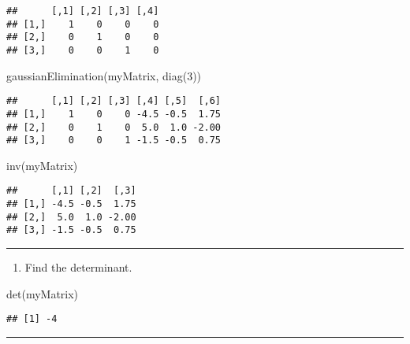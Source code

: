 \documentclass[
]{article}
\newenvironment{Shaded}{\begin{snugshade}}{\end{snugshade}}
\newcommand{\DecValTok}[1]{\textcolor[rgb]{0.00,0.00,0.81}{#1}}
\newcommand{\FunctionTok}[1]{\textcolor[rgb]{0.00,0.00,0.00}{#1}}
\newcommand{\NormalTok}[1]{#1}
\providecommand{\tightlist}{%
  \setlength{\itemsep}{0pt}\setlength{\parskip}{0pt}}
\begin{document}
\begin{verbatim}
##      [,1] [,2] [,3] [,4]
## [1,]    1    0    0    0
## [2,]    0    1    0    0
## [3,]    0    0    1    0
\end{verbatim}

\begin{Shaded}
\begin{Highlighting}[]
\FunctionTok{gaussianElimination}\NormalTok{(myMatrix, }\FunctionTok{diag}\NormalTok{(}\DecValTok{3}\NormalTok{))}
\end{Highlighting}
\end{Shaded}

\begin{verbatim}
##      [,1] [,2] [,3] [,4] [,5]  [,6]
## [1,]    1    0    0 -4.5 -0.5  1.75
## [2,]    0    1    0  5.0  1.0 -2.00
## [3,]    0    0    1 -1.5 -0.5  0.75
\end{verbatim}

\begin{Shaded}
\begin{Highlighting}[]
\FunctionTok{inv}\NormalTok{(myMatrix)}
\end{Highlighting}
\end{Shaded}

\begin{verbatim}
##      [,1] [,2]  [,3]
## [1,] -4.5 -0.5  1.75
## [2,]  5.0  1.0 -2.00
## [3,] -1.5 -0.5  0.75
\end{verbatim}

\begin{center}\rule{0.5\linewidth}{0.5pt}\end{center}

\begin{enumerate}
\def\labelenumi{\arabic{enumi}.}
\setcounter{enumi}{9}
\tightlist
\item
  Find the determinant.
\end{enumerate}

\begin{Shaded}
\begin{Highlighting}[]
\FunctionTok{det}\NormalTok{(myMatrix)}
\end{Highlighting}
\end{Shaded}

\begin{verbatim}
## [1] -4
\end{verbatim}

\begin{center}\rule{0.5\linewidth}{0.5pt}\end{center}
\end{document}
